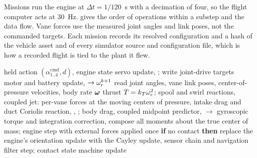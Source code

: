 \documentclass[10pt,letterpaper]{article}
\begin{document}
Missions run the engine at $\Delta t = 1/120$~\si{\second} with a decimation of four, so the flight computer acts at \SI{30}{\hertz}.
 gives the order of operations within a substep and  the data flow.
Vane forces use the measured joint angles and link poses, not the commanded targets.
Each mission records its resolved configuration and a hash of the vehicle asset and of every simulator source and configuration file, which is how a recorded flight is tied to the plant it flew.

\begin{algorithm}[t]
\caption{One physics substep of the mission plant}
\label{alg:substep}
\small
\begin{algorithmic}[1]
\Require held action $(\alpha^{\text{cmd}}_{1..4}, d)$, engine state
\State servo update, ; write joint-drive targets
\State motor and battery update,  $\to \omega_r^{k+1}$
\State read joint angles, vane link poses, center-of-pressure velocities, body rate $\bm{\omega}$
\State thrust $T=k_T\omega_r^2$; spool and swirl reactions, 
\State coupled jet: per-vane forces at the moving centers of pressure, 
\State intake drag and duct Coriolis reaction, , ; body drag, 
\State coupled midpoint predictor,  $\to$ gyroscopic torque and integration correction, 
\State compose all moments about the true center of mass; engine step with external forces applied once
\State \textbf{if} no contact \textbf{then} replace the engine's orientation update with the Cayley update, 
\State sensor chain and navigation filter step; contact state machine update
\end{algorithmic}
\end{algorithm}
\end{document}
